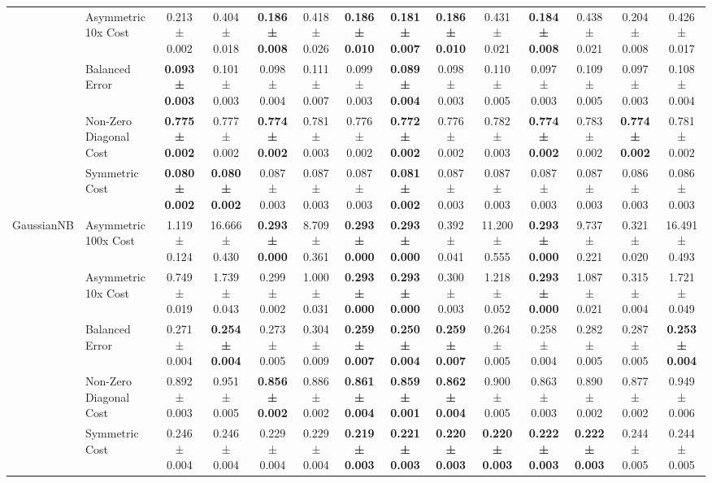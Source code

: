 \begin{table}[H]
{\begin{tabular}{llcccccccccccc}
 & Asymmetric 10x Cost & 0.213 ± 0.002 & 0.404 ± 0.018 & \textbf{0.186 ± 0.008} & 0.418 ± 0.026 & \textbf{0.186 ± 0.010} & \textbf{0.181 ± 0.007} & \textbf{0.186 ± 0.010} & 0.431 ± 0.021 & \textbf{0.184 ± 0.008} & 0.438 ± 0.021 & 0.204 ± 0.008 & 0.426 ± 0.017 \\
 & Balanced Error & \textbf{0.093 ± 0.003} & 0.101 ± 0.003 & 0.098 ± 0.004 & 0.111 ± 0.007 & 0.099 ± 0.003 & \textbf{0.089 ± 0.004} & 0.098 ± 0.003 & 0.110 ± 0.005 & 0.097 ± 0.003 & 0.109 ± 0.005 & 0.097 ± 0.003 & 0.108 ± 0.004 \\
 & Non-Zero Diagonal Cost & \textbf{0.775 ± 0.002} & 0.777 ± 0.002 & \textbf{0.774 ± 0.002} & 0.781 ± 0.003 & 0.776 ± 0.002 & \textbf{0.772 ± 0.002} & 0.776 ± 0.002 & 0.782 ± 0.003 & \textbf{0.774 ± 0.002} & 0.783 ± 0.002 & \textbf{0.774 ± 0.002} & 0.781 ± 0.002 \\
 & Symmetric Cost & \textbf{0.080 ± 0.002} & \textbf{0.080 ± 0.002} & 0.087 ± 0.003 & 0.087 ± 0.003 & 0.087 ± 0.003 & \textbf{0.081 ± 0.002} & 0.087 ± 0.003 & 0.087 ± 0.003 & 0.087 ± 0.003 & 0.087 ± 0.003 & 0.086 ± 0.003 & 0.086 ± 0.003 \\
\cline{1-14}
\multirow[t]{5}{*}{GaussianNB} & Asymmetric 100x Cost & 1.119 ± 0.124 & 16.666 ± 0.430 & \textbf{0.293 ± 0.000} & 8.709 ± 0.361 & \textbf{0.293 ± 0.000} & \textbf{0.293 ± 0.000} & 0.392 ± 0.041 & 11.200 ± 0.555 & \textbf{0.293 ± 0.000} & 9.737 ± 0.221 & 0.321 ± 0.020 & 16.491 ± 0.493 \\
 & Asymmetric 10x Cost & 0.749 ± 0.019 & 1.739 ± 0.043 & 0.299 ± 0.002 & 1.000 ± 0.031 & \textbf{0.293 ± 0.000} & \textbf{0.293 ± 0.000} & 0.300 ± 0.003 & 1.218 ± 0.052 & \textbf{0.293 ± 0.000} & 1.087 ± 0.021 & 0.315 ± 0.004 & 1.721 ± 0.049 \\
 & Balanced Error & 0.271 ± 0.004 & \textbf{0.254 ± 0.004} & 0.273 ± 0.005 & 0.304 ± 0.009 & \textbf{0.259 ± 0.007} & \textbf{0.250 ± 0.004} & \textbf{0.259 ± 0.007} & 0.264 ± 0.005 & 0.258 ± 0.004 & 0.282 ± 0.005 & 0.287 ± 0.005 & \textbf{0.253 ± 0.004} \\
 & Non-Zero Diagonal Cost & 0.892 ± 0.003 & 0.951 ± 0.005 & \textbf{0.856 ± 0.002} & 0.886 ± 0.002 & \textbf{0.861 ± 0.004} & \textbf{0.859 ± 0.001} & \textbf{0.862 ± 0.004} & 0.900 ± 0.005 & 0.863 ± 0.003 & 0.890 ± 0.002 & 0.877 ± 0.002 & 0.949 ± 0.006 \\
 & Symmetric Cost & 0.246 ± 0.004 & 0.246 ± 0.004 & 0.229 ± 0.004 & 0.229 ± 0.004 & \textbf{0.219 ± 0.003} & \textbf{0.221 ± 0.003} & \textbf{0.220 ± 0.003} & \textbf{0.220 ± 0.003} & \textbf{0.222 ± 0.003} & \textbf{0.222 ± 0.003} & 0.244 ± 0.005 & 0.244 ± 0.005 \\

\end{tabular}}
\end{table}
